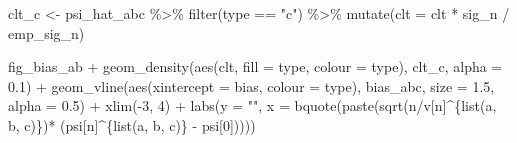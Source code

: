 \documentclass[
  11pt,
  openright,twoside]{book}
\newenvironment{Shaded}{\begin{snugshade}}{\end{snugshade}}
\newcommand{\AttributeTok}[1]{\textcolor[rgb]{0.77,0.63,0.00}{#1}}
\newcommand{\DecValTok}[1]{\textcolor[rgb]{0.00,0.00,0.81}{#1}}
\newcommand{\FloatTok}[1]{\textcolor[rgb]{0.00,0.00,0.81}{#1}}
\newcommand{\FunctionTok}[1]{\textcolor[rgb]{0.00,0.00,0.00}{#1}}
\newcommand{\NormalTok}[1]{#1}
\newcommand{\OtherTok}[1]{\textcolor[rgb]{0.56,0.35,0.01}{#1}}
\newcommand{\SpecialCharTok}[1]{\textcolor[rgb]{0.00,0.00,0.00}{#1}}
\newcommand{\StringTok}[1]{\textcolor[rgb]{0.31,0.60,0.02}{#1}}
\theoremstyle{definition}
\theoremstyle{definition}
\theoremstyle{definition}
\theoremstyle{definition}
\theoremstyle{remark}
\begin{document}
\begin{Shaded}
\begin{Highlighting}[]
\NormalTok{clt\_c }\OtherTok{\textless{}{-}}\NormalTok{ psi\_hat\_abc }\SpecialCharTok{\%\textgreater{}\%} \FunctionTok{filter}\NormalTok{(type }\SpecialCharTok{==} \StringTok{"c"}\NormalTok{) }\SpecialCharTok{\%\textgreater{}\%}
  \FunctionTok{mutate}\NormalTok{(}\AttributeTok{clt =}\NormalTok{ clt }\SpecialCharTok{*}\NormalTok{ sig\_n }\SpecialCharTok{/}\NormalTok{ emp\_sig\_n)}

\NormalTok{fig\_bias\_ab }\SpecialCharTok{+}
  \FunctionTok{geom\_density}\NormalTok{(}\FunctionTok{aes}\NormalTok{(clt, }\AttributeTok{fill =}\NormalTok{ type, }\AttributeTok{colour =}\NormalTok{ type), clt\_c, }\AttributeTok{alpha =} \FloatTok{0.1}\NormalTok{) }\SpecialCharTok{+}
  \FunctionTok{geom\_vline}\NormalTok{(}\FunctionTok{aes}\NormalTok{(}\AttributeTok{xintercept =}\NormalTok{ bias, }\AttributeTok{colour =}\NormalTok{ type),}
\NormalTok{             bias\_abc, }\AttributeTok{size =} \FloatTok{1.5}\NormalTok{, }\AttributeTok{alpha =} \FloatTok{0.5}\NormalTok{) }\SpecialCharTok{+}
  \FunctionTok{xlim}\NormalTok{(}\SpecialCharTok{{-}}\DecValTok{3}\NormalTok{, }\DecValTok{4}\NormalTok{) }\SpecialCharTok{+} 
  \FunctionTok{labs}\NormalTok{(}\AttributeTok{y =} \StringTok{""}\NormalTok{,}
       \AttributeTok{x =} \FunctionTok{bquote}\NormalTok{(}\FunctionTok{paste}\NormalTok{(}\FunctionTok{sqrt}\NormalTok{(n}\SpecialCharTok{/}\NormalTok{v[n]}\SpecialCharTok{\^{}}\NormalTok{\{}\FunctionTok{list}\NormalTok{(a, b, c)\})}\SpecialCharTok{*}
\NormalTok{                        (psi[n]}\SpecialCharTok{\^{}}\NormalTok{\{}\FunctionTok{list}\NormalTok{(a, b, c)\} }\SpecialCharTok{{-}}\NormalTok{ psi[}\DecValTok{0}\NormalTok{]))))}
\end{Highlighting}
\end{Shaded}
\end{document}

